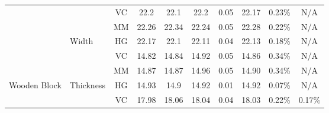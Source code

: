 \begin{table}[h!]
{\begin{tabular}{|l|l|cccc|c|c|c|c|}
			                                  &                                  & \multicolumn{1}{c|}{VC}                & \multicolumn{1}{c|}{22.2}                        & \multicolumn{1}{c|}{22.1}                        & 22.2                        & 0.05                        & 22.17                       & 0.23\%                      & \cellcolor[HTML]{FF0000}N/A \\ \cline{3-10}
			                                  &                                  & \multicolumn{1}{c|}{MM}                & \multicolumn{1}{c|}{22.26}                       & \multicolumn{1}{c|}{22.34}                       & 22.24                       & 0.05                        & 22.28                       & 0.22\%                      & \cellcolor[HTML]{FF0000}N/A \\ \cline{3-10}
			                                  & \multirow{-3}{*}{Width}          & \multicolumn{1}{c|}{HG}                & \multicolumn{1}{c|}{22.17}                       & \multicolumn{1}{c|}{22.1}                        & 22.11                       & 0.04                        & 22.13                       & 0.18\%                      & \cellcolor[HTML]{FF0000}N/A \\ \cline{2-10}
			                                  &                                  & \multicolumn{1}{c|}{VC}                & \multicolumn{1}{c|}{14.82}                       & \multicolumn{1}{c|}{14.84}                       & 14.92                       & 0.05                        & 14.86                       & 0.34\%                      & \cellcolor[HTML]{FF0000}N/A \\ \cline{3-10}
			                                  &                                  & \multicolumn{1}{c|}{MM}                & \multicolumn{1}{c|}{14.87}                       & \multicolumn{1}{c|}{14.87}                       & 14.96                       & 0.05                        & 14.90                       & 0.34\%                      & \cellcolor[HTML]{FF0000}N/A \\ \cline{3-10}
			\multirow{-9}{*}{Wooden Block}    & \multirow{-3}{*}{Thickness}      & \multicolumn{1}{c|}{HG}                & \multicolumn{1}{c|}{14.93}                       & \multicolumn{1}{c|}{14.9}                        & 14.92                       & 0.01                        & 14.92                       & 0.07\%                      & \cellcolor[HTML]{FF0000}N/A \\ \hline
			                                  &                                  & \multicolumn{1}{c|}{VC}                & \multicolumn{1}{c|}{17.98}                       & \multicolumn{1}{c|}{18.06}                       & 18.04                       & 0.04                        & 18.03                       & 0.22\%                      & 0.17\%                      \\ \cline{3-10}

\end{tabular}}
\end{table}

